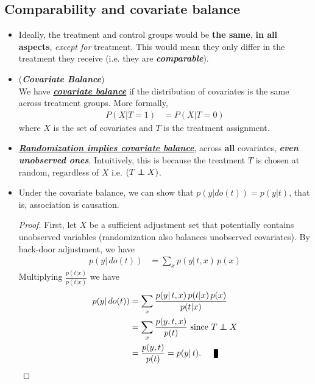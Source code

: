 \documentclass[11pt]{article}
\begin{document}
\subsection{Comparability and covariate balance}
\begin{itemize}
\item Ideally, the treatment and control groups would be \textbf{the same}, \textbf{in all aspects}, \emph{except for} treatment. This would mean they only differ in the treatment they receive (i.e. they are \emph{\textbf{comparable}}).

\item \begin{definition}(\emph{\textbf{Covariate Balance}}) \citep{neal2020introduction}\\
 We have \underline{\emph{\textbf{covariate balance}}} if the distribution of covariates is the same across treatment groups. More formally,
 \begin{align}
P(X|T=1) &= P(X|T=0)  \label{eqn: cov_balance}
 \end{align} where $X$ is the set of covariates and $T$ is the treatment assignment. 
\end{definition}

\item \underline{\emph{\textbf{Randomization implies covariate balance}}}, across \textbf{all} covariates, \emph{\textbf{even unobserved ones}}. Intuitively, this is because the treatment $T$ is chosen at random, regardless of $X$ i.e. $(T \indep X)$.

\item Under the covariate balance, we can show that $p(y | do(t)) = p(y| t)$, that is, association is causation. 
\begin{proof} 
First, let $X$ be a sufficient adjustment set that potentially contains unobserved variables (randomization also balances unobserved covariates). By back-door adjustment, we have 
\begin{align*}
p(y | \,do(t)) &= \sum_{x}p(y |\, t, x)\,p(x)
\end{align*} Multiplying $\frac{p(t|x)}{p(t|x)}$ we have
\begin{align*}
p(y | \,do(t)) &= \sum_{x}\frac{p(y |\, t, x)\,p(t|x)\,p(x)}{p(t|x)} \\
&= \sum_{x}\frac{p(y, t, x)}{p(t)} \text{ since }T \indep X \\
&= \frac{p(y, t)}{p(t)} = p(y|\,t). \qed
\end{align*}
\end{proof}
\end{itemize}
\end{document}
